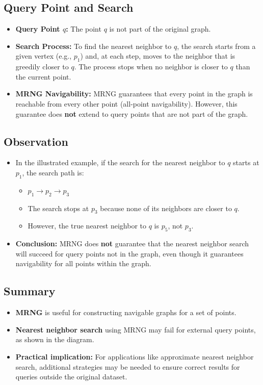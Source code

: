 \documentclass{article}
\begin{document}
\newpage
\subsection*{Query Point and Search}
\begin{itemize}
    \item \textbf{Query Point $q$:} The point $q$ is not part of the original graph.
    \item \textbf{Search Process:} To find the nearest neighbor to $q$, the search starts from a given vertex (e.g., $p_1$) and, at each step, moves to the neighbor that is greedily closer to $q$. The process stops when no neighbor is closer to $q$ than the current point.
    \item \textbf{MRNG Navigability:} MRNG guarantees that every point in the graph is reachable from every other point (all-point navigability). However, this guarantee does \textbf{not} extend to query points that are not part of the graph.
\end{itemize}

\subsection*{Observation}
\begin{itemize}
    \item In the illustrated example, if the search for the nearest neighbor to $q$ starts at $p_1$, the search path is:
    \begin{itemize}
        \item $p_1 \rightarrow p_2 \rightarrow p_3$
        \item The search stops at $p_3$ because none of its neighbors are closer to $q$.
        \item However, the true nearest neighbor to $q$ is $p_5$, not $p_3$.
    \end{itemize}
    \item \textbf{Conclusion:} MRNG does \textbf{not} guarantee that the nearest neighbor search will succeed for query points not in the graph, even though it guarantees navigability for all points within the graph.
\end{itemize}

\subsection*{Summary}
\begin{itemize}
    \item \textbf{MRNG} is useful for constructing navigable graphs for a set of points.
    \item \textbf{Nearest neighbor search} using MRNG may fail for external query points, as shown in the diagram.
    \item \textbf{Practical implication:} For applications like approximate nearest neighbor search, additional strategies may be needed to ensure correct results for queries outside the original dataset.
\end{itemize}
\end{document}
